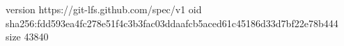 version https://git-lfs.github.com/spec/v1
oid sha256:fdd593ea4fc278e51f4c3b3fac03ddaafcb5aced61c45186d33d7bf22e78b444
size 43840
